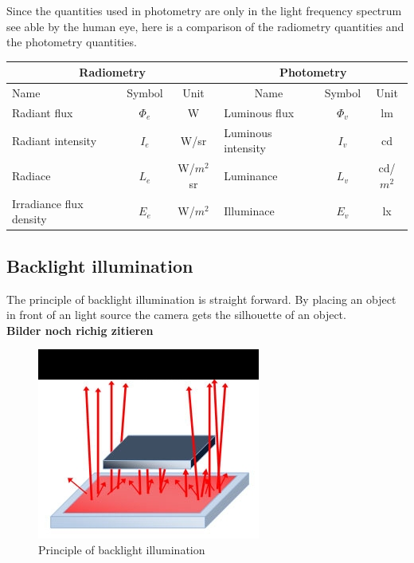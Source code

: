 Since the quantities used in photometry are only in the light frequency spectrum see able by the human eye, here is a comparison of the radiometry quantities and the photometry quantities.\\

\begin{tabular}{ |p{4cm} p{2cm} p{2cm}|p{4cm} p{2cm} p{2cm}|  }
		\hline
		\multicolumn{3}{|c}{Radiometry}&\multicolumn{3}{|c|}{Photometry} \\
		\hline\hline
		\multicolumn{1}{|l}{Name}			& \multicolumn{1}{c}{Symbol}& \multicolumn{1}{c|}{Unit}	& \multicolumn{1}{c}{Name}	& \multicolumn{1}{c}{Symbol}	& \multicolumn{1}{c|}{Unit}\\
		\hline
		Radiant flux			& \multicolumn{1}{|c|}{$\Phi_e$}&  \multicolumn{1}{|c|}{W}		& Luminous flux		& \multicolumn{1}{|c|}{$\Phi_v$}	&  \multicolumn{1}{|c|}{lm}\\
		Radiant intensity		& \multicolumn{1}{|c|}{$I_e$}	&  \multicolumn{1}{|c|}{W/sr}	&Luminous intensity 	& \multicolumn{1}{|c|}{$I_v$} 		&  \multicolumn{1}{|c|}{cd}\\
		Radiace					& \multicolumn{1}{|c|}{$L_e$}	&  \multicolumn{1}{|c|}{W/$m^2$sr}		&Luminance			& \multicolumn{1}{|c|}{$L_v$}		&  \multicolumn{1}{|c|}{cd/$m^2$}\\
		Irradiance flux density	& \multicolumn{1}{|c|}{$E_e$}	&  \multicolumn{1}{|c|}{W/$m^2$}		&Illuminace 			& \multicolumn{1}{|c|}{$E_v$} 		&  \multicolumn{1}{|c|}{lx}\\
		
		\hline
\end{tabular}

\newpage

\subsection{Backlight illumination}
The principle of backlight illumination is straight forward. By placing an object in front of an light source the camera gets the silhouette of an object. \\
\textbf{Bilder noch richig zitieren}
\begin{figure}[ht]
	\centering
	\includegraphics[width=0.5\linewidth]{2-theory/backlight/principle_backlight_illumination.jpg}
	\caption{Principle of backlight illumination\label{theory:backlight}}	
\end{figure}

